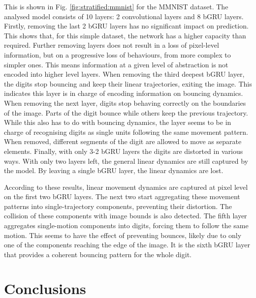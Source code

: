 \documentclass[runningheads]{llncs}
\begin{document}
This is shown in Fig. \ref{fig:stratified:mmnist} for the MMNIST dataset. The analysed model consists of 10 layers: 2 convolutional layers and 8 bGRU layers. Firstly, removing the last 2 bGRU layers has no significant impact on prediction. This shows that, for this simple dataset, the network has a higher capacity than required. Further removing layers does not result in a loss of pixel-level information, but on a progressive loss of behaviours, from more complex to simpler ones. This means information at a given level of abstraction is not encoded into higher level layers. When removing the third deepest bGRU layer, the digits stop bouncing and keep their linear trajectories, exiting the image. This indicates this layer is in charge of encoding information on bouncing dynamics. When removing the next layer, digits stop behaving correctly on the boundaries of the image. Parts of the digit bounce while others keep the previous trajectory. While this also has to do with bouncing dynamics, the layer seems to be in charge of recognising digits as single units following the same movement pattern. When removed, different segments of the digit are allowed to move as separate elements. Finally, with only 3-2 bGRU layers the digits are distorted in various ways. With only two layers left, the general linear dynamics are still captured by the model. By leaving a single bGRU layer, the linear dynamics are lost.

According to these results, linear movement dynamics are captured at pixel level on the first two bGRU layers. The next two start aggregating these movement patterns into single-trajectory components, preventing their distortion. The collision of these components with image bounds is also detected. The fifth layer aggregates single-motion components into digits, forcing them to follow the same motion. This seems to have the effect of preventing bounces, likely due to only one of the components reaching the edge of the image. It is the sixth bGRU layer that provides a coherent bouncing pattern for the whole digit.

\section{Conclusions}
\label{sec:conclusions}
\end{document}
